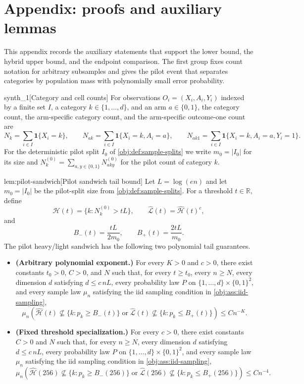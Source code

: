 \section{Appendix: proofs and auxiliary lemmas}

This appendix records the auxiliary statements that support the lower bound, the hybrid upper bound, and the endpoint comparison. The first group fixes count notation for arbitrary subsamples and gives the pilot event that separates categories by population mass with polynomially small error probability.

\begin{definitionv}{synth_1}[Category and cell counts]
For observations \(O_i=(X_i,A_i,Y_i)\) indexed by a finite set \(I\), a category \(k\in\{1,\ldots,d\}\), and an arm \(a\in\{0,1\}\), the category count, the arm-specific category count, and the arm-specific outcome-one count are \[ N_k=\sum_{i\in I}\mathbf 1\{X_i=k\},\qquad N_{ak}=\sum_{i\in I}\mathbf 1\{X_i=k,A_i=a\},\qquad N_{ak1}=\sum_{i\in I}\mathbf 1\{X_i=k,A_i=a,Y_i=1\}. \] For the deterministic pilot split \(I_0\) of \cref{obj:def:sample-splits} we write \(m_0=|I_0|\) for its size and \(N_k^{(0)}=\sum_{a,y\in\{0,1\}}N^{(0)}_{aky}\) for the pilot count of category \(k\).
\end{definitionv}

\begin{lemmav}{lem:pilot-sandwich}[Pilot sandwich tail bound]
Let \(L=\log(en)\) and let \(m_0=|I_0|\) be the pilot-split size from \cref{obj:def:sample-splits}.  For a threshold \(t\in\mathbb R\), define
\[
\widehat{\mathcal H}(t)=\{k:N_k^{(0)}>tL\},\qquad
\widehat{\mathcal L}(t)=\widehat{\mathcal H}(t)^c,
\]
and
\[
B_-(t)=\frac{tL}{2m_0},\qquad
B_+(t)=\frac{2tL}{m_0}.
\]
The pilot heavy/light sandwich has the following two polynomial tail guarantees.
\begin{itemize}
\item \textbf{(Arbitrary polynomial exponent.)} For every \(K>0\) and \(c>0\), there exist constants \(t_0>0\), \(C>0\), and \(N\) such that, for every \(t\ge t_0\), every \(n\ge N\), every dimension \(d\) satisfying \(d\le c\,nL\), every probability law \(P\) on \(\{1,\ldots,d\}\times\{0,1\}^2\), and every sample law \(\mu_n\) satisfying the iid sampling condition in \cref{obj:ass:iid-sampling},
\[
\mu_n\!\left(
\widehat{\mathcal H}(t)\not\subseteq\{k:p_k\ge B_-(t)\}
\;\text{or}\;
\widehat{\mathcal L}(t)\not\subseteq\{k:p_k\le B_+(t)\}
\right)
\le C n^{-K}.
\]
\item \textbf{(Fixed threshold specialization.)} For every \(c>0\), there exist constants \(C>0\) and \(N\) such that, for every \(n\ge N\), every dimension \(d\) satisfying \(d\le c\,nL\), every probability law \(P\) on \(\{1,\ldots,d\}\times\{0,1\}^2\), and every sample law \(\mu_n\) satisfying the iid sampling condition in \cref{obj:ass:iid-sampling},
\[
\mu_n\!\left(
\widehat{\mathcal H}(256)\not\subseteq\{k:p_k\ge B_-(256)\}
\;\text{or}\;
\widehat{\mathcal L}(256)\not\subseteq\{k:p_k\le B_+(256)\}
\right)
\le C n^{-4}.
\]
\end{itemize}
\end{lemmav}


